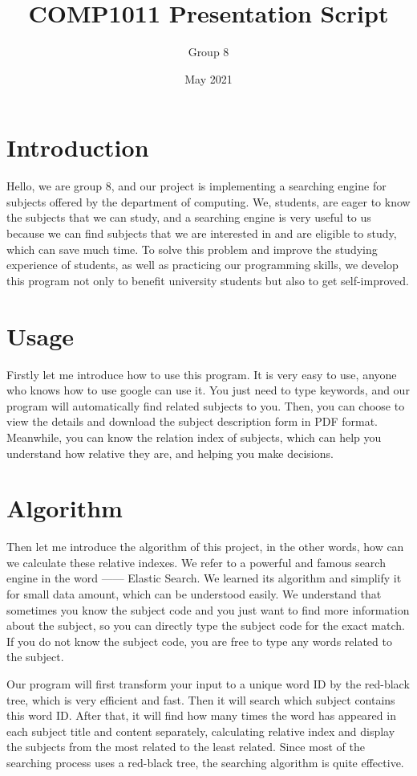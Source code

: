 \documentclass{article}
\title{COMP1011 Presentation Script}
\author{Group 8 }
\date{May 2021}
\begin{document}
\maketitle


\section{Introduction}
Hello, we are group 8, and our project is implementing a searching engine for subjects offered by the department of computing. We, students, are eager to know the subjects that we can study, and a searching engine is very useful to us because we can find subjects that we are interested in and are eligible to study, which can save much time. To solve this problem and improve the studying experience of students, as well as practicing our programming skills, we develop this program not only to benefit university students but also to get self-improved.

\section{Usage}
Firstly let me introduce how to use this program. It is very easy to use, anyone who knows how to use google can use it. You just need to type keywords, and our program will automatically find related subjects to you. Then, you can choose to view the details and download the subject description form in PDF format. Meanwhile, you can know the relation index of subjects, which can help you understand how relative they are, and helping you make decisions. 

\section{Algorithm}
Then let me introduce the algorithm of this project, in the other words, how can we calculate these relative indexes. We refer to a powerful and famous search engine in the word ------ Elastic Search. We learned its algorithm and simplify it for small data amount, which can be understood easily. We understand that sometimes you know the subject code and you just want to find more information about the subject, so you can directly type the subject code for the exact match. If you do not know the subject code, you are free to type any words related to the subject. 

Our program will first transform your input to a unique word ID by the red-black tree, which is very efficient and fast. Then it will search which subject contains this word ID. After that, it will find how many times the word has appeared in each subject title and content separately, calculating relative index and display the subjects from the most related to the least related. Since most of the searching process uses a red-black tree, the searching algorithm is quite effective.
\end{document}
